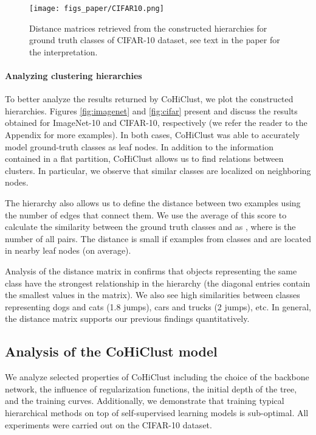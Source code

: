 \documentclass[runningheads]{llncs}
\def\our{CoHiClust}
\begin{document}
\begin{figure}[!htb]
    \centering    \texttt{[image: figs\_paper/CIFAR10.png]}
\caption{Distance matrices retrieved from the constructed hierarchies for ground truth classes of CIFAR-10 dataset, see text in the paper for the interpretation.}
    \label{fig:dist}
\end{figure}




\paragraph{Analyzing clustering hierarchies} To better analyze the results returned by \our{}, we plot the constructed hierarchies. Figures \ref{fig:imagenet} and \ref{fig:cifar} present and discuss the results obtained for ImageNet-10 and CIFAR-10, respectively (we refer the reader to the Appendix for more examples).  In both cases, \our{} was able to accurately model ground-truth classes as leaf nodes. In addition to the information contained in a flat partition, \our{} allows us to find relations between clusters. In particular, we observe that similar classes are localized on neighboring nodes. 

The hierarchy also allows us to define the distance  between two examples  using the number of edges that connect them. We use the average of this score to calculate the similarity between the ground truth classes  and  as , where  is the number of all pairs. The distance is small if examples from classes  and  are located in nearby leaf nodes (on average). 




Analysis of the distance matrix in  confirms that objects representing the same class have the strongest relationship in the hierarchy (the diagonal entries contain the smallest values in the matrix). We also see high similarities between classes representing dogs and cats (1.8 jumps), cars and trucks (2 jumps), etc. In general, the distance matrix supports our previous findings quantitatively. 

\subsection{Analysis of the \our{} model} \label{sec:analysis}

We analyze selected properties of \our{} including the choice of the backbone network, the influence of regularization functions, the initial depth of the tree, and the training curves. Additionally, we demonstrate that training typical hierarchical methods on top of self-supervised learning models is sub-optimal. All experiments were carried out on the CIFAR-10 dataset.
\end{document}
